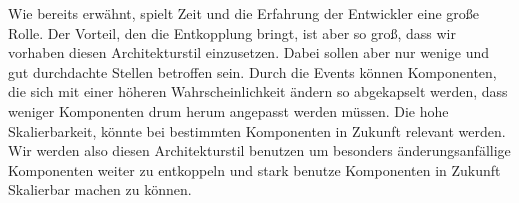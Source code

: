 \vspace{6pt}

Wie bereits erwähnt, spielt Zeit und die Erfahrung der Entwickler eine große Rolle. Der Vorteil, den die Entkopplung bringt, ist aber so groß, dass wir vorhaben diesen Architekturstil einzusetzen. Dabei sollen aber nur wenige und gut durchdachte Stellen betroffen sein. Durch die Events können Komponenten, die sich mit einer höheren Wahrscheinlichkeit ändern so abgekapselt werden, dass weniger Komponenten drum herum angepasst werden müssen. Die hohe Skalierbarkeit, könnte bei bestimmten Komponenten in Zukunft relevant werden. Wir werden also diesen Architekturstil benutzen um besonders änderungsanfällige Komponenten weiter zu entkoppeln und stark benutze Komponenten in Zukunft Skalierbar machen zu können. 
